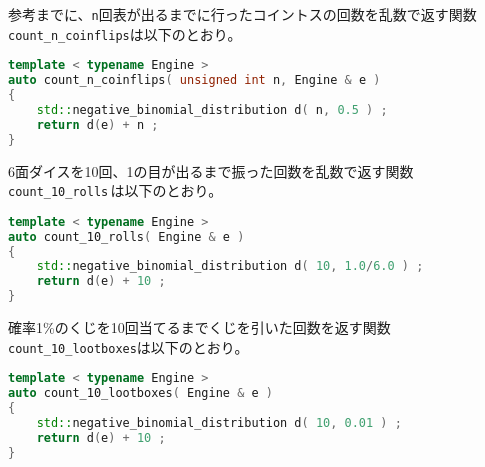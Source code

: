 参考までに、\texttt{n}回表が出るまでに行ったコイントスの回数を乱数で返す関数\texttt{count\_n\_coinflips}は以下のとおり。

\begin{lstlisting}[language={C++}]
template < typename Engine >
auto count_n_coinflips( unsigned int n, Engine & e )
{
    std::negative_binomial_distribution d( n, 0.5 ) ;
    return d(e) + n ;
}
\end{lstlisting}

6面ダイスを10回、1の目が出るまで振った回数を乱数で返す関数\,\texttt{count\_10\_rolls}\,は以下のとおり。

\begin{lstlisting}[language={C++}]
template < typename Engine >
auto count_10_rolls( Engine & e )
{
    std::negative_binomial_distribution d( 10, 1.0/6.0 ) ;
    return d(e) + 10 ;
}
\end{lstlisting}

確率1\%のくじを10回当てるまでくじを引いた回数を返す関数\texttt{count\_10\_lootboxes}は以下のとおり。

\begin{lstlisting}[language={C++}]
template < typename Engine >
auto count_10_lootboxes( Engine & e )
{
    std::negative_binomial_distribution d( 10, 0.01 ) ;
    return d(e) + 10 ;
}
\end{lstlisting}


